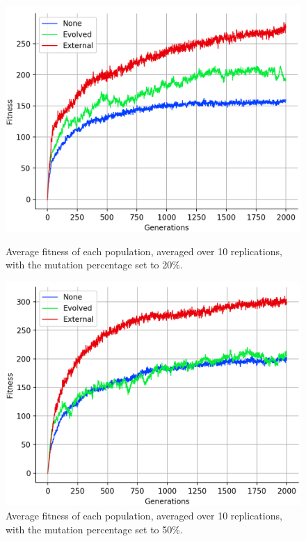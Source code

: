 \documentclass[12pt,a4paper]{report}
\begin{document}
\begin{figure}[t]
   \centering
   \begin{minipage}{0.49\textwidth}
          \centering
          \captionsetup{width=.9\linewidth}
          \includegraphics[width=1.\linewidth]{results/average-mut20.png}
          \caption{Average fitness of each population, averaged over 10 replications, with the mutation percentage set to 20\%.}
          \label{fig:average-mut20}
   \end{minipage}
   \begin{minipage}{0.49\textwidth}
          \centering
          \captionsetup{width=.9\linewidth}
          \includegraphics[width=1.\linewidth]{results/average-mut50.png}
          \caption{Average fitness of each population, averaged over 10 replications, with the mutation percentage set to 50\%.}
          \label{fig:average-mut50}
   \end{minipage}
\end{figure}
\end{document}
